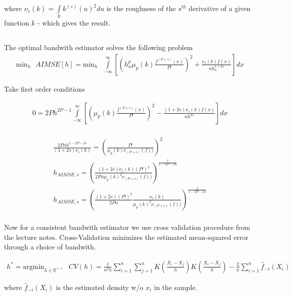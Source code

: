 \documentclass[12pt]{article}
\newcommand{\R}{\mathbb{R}}
\begin{document}
where $\nu_s(k) = \int\limits_\R k^{(s)} \left( u \right)^2 du $ is the roughness of the $s^{th}$ derivative of a given function $k$ - which gives the result.

\subsection{}

The optimal bandwith estimator solves the following problem
\begin{gather*}
\text{min}_h \text{   } AIMSE[h] = \text{min}_h \text{   } \int\limits_{-\infty}^{\infty} \left[ \left( h_n^p \mu_p(k) \frac{f^{(P+s)}(x)}{P!} \right)^2 + \frac{\nu_s(k) f(x)}{nh_n^{1+2s}} \right] dx
\end{gather*}

Take first order conditions

\begin{gather*}
0 =  2P h^{2P-1} \int\limits_{-\infty}^{\infty} \left[ \left( \mu_p(k) \frac{f^{(P+s)}(x)}{P!} \right)^2 - \frac{(1+2s) \nu_s(k) f(x)}{nh^{2s}} \right] dx\\
\end{gather*}


\begin{gather*}
\frac{2Pnh^{1-2P-2s}}{(1+2s) \nu_s(k)} = \left( \frac{P!}{\mu_p(k) \nu_{(P+s)}(f))} \right)^2\\
h_{AIMSE,s} = \left( \frac{ (1+2s) \nu_s(k) (P!)^2     }{ 2Pn \mu_p(k)^2 \nu_{(P+s)}(f))} \right)^{\frac{1}{1-2P-2s}}\\
h_{AIMSE,s} = \left( \frac{(1+2s)  (P!)^2     }{2Pn}     \frac{\nu_s(k)}{  \mu_p(k)^2 \nu_{(P+s)}(f))} \right)^{\frac{1}{1-2P-2s}}\\
\end{gather*}


Now for a consistent bandwith estimator we use cross validation procedure from the lecture notes. Cross-Validation minimizes the estimated mean-squared error through a choice of bandwith.

\begin{gather*}
h^* = \text{argmin}_{h \in \R^{++}} \text{   } CV(h) = \frac{1}{n^2h} \sum\limits_{i=1}^n \sum\limits_{j=1}^n K\left( \frac{X_i - X_j}{h}\right) K\left( \frac{X_i - X_j}{h} \right) - \frac{2}{n} \sum\limits_{i=1}^n \hat{f}_{-i}(X_i)
\end{gather*}

where $\hat{f}_{-i}(X_i)$ is the estimated density w/o $x_i$ in the sample.

\subsection{}
\end{document}
